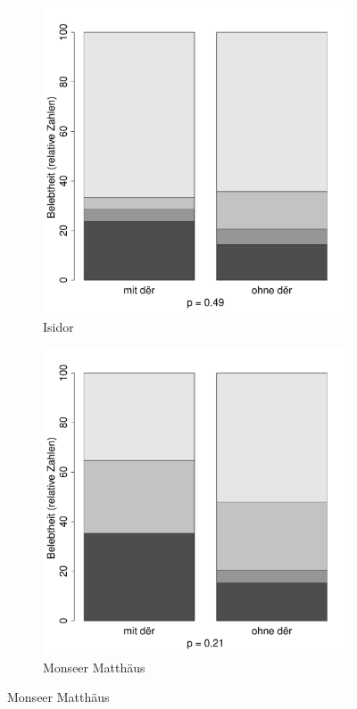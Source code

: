 \begin{figure}
\begin{subfigure}[b]{.5\linewidth}
  \includegraphics[height=.25\textheight]{generated/images/belebtheit-hapaxe-I}
\caption {Isidor}
\end{subfigure}%
\begin{subfigure}[b]{.5\linewidth}
  \includegraphics[height=.25\textheight]{generated/images/belebtheit-hapaxe-M}
\caption {Monseer Matthäus}
\end{subfigure}


\end{figure}
